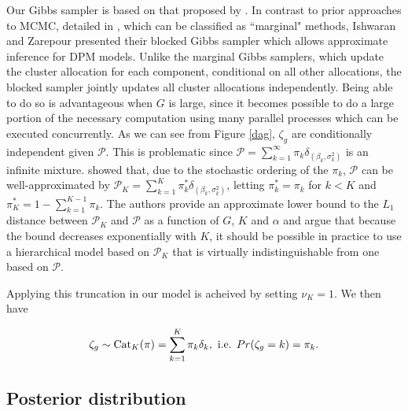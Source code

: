 {Our Gibbs sampler is based on that proposed by \citet{ishwaran2000}. In contrast to prior approaches to MCMC, detailed in \citet{neal2000}, which can be classified as ``marginal" methods, Ishwaran and Zarepour presented their blocked Gibbs sampler which allows approximate inference for DPM models. Unlike the marginal Gibbs samplers, which update the cluster allocation for each component, conditional on all other allocations, the blocked sampler jointly updates all cluster allocations independently. Being able to do so is advantageous when $G$ is large, since it becomes possible to do a large portion of the necessary computation using many parallel processes which can be executed concurrently. As we can see from Figure \ref{dag}, $\zeta_g$ are conditionally independent given $\mathcal{P}$. This is problematic since $\mathcal{P}=\sum_{k=1}^\infty \pi_k \delta_{(\beta_k,\sigma^2_k)}$ is an infinite mixture. \cite{ishwaran2001} showed that, due to the stochastic ordering of the $\pi_k$, $\mathcal{P}$ can be well-approximated by $\mathcal{P}_K=\sum_{k=1}^K \pi^*_k \delta_{(\beta_k,\sigma^2_k)}$, letting $\pi_k^*=\pi_k$ for $k<K$ and $\pi_K^* = 1-\sum_{k=1}^{K-1} \pi_k$. The authors provide an approximate lower bound to the $L_1$ distance between $\mathcal{P}_K$ and $\mathcal{P}$ as a function of $G$, $K$ and $\alpha$ and argue that because the bound decreases exponentially with $K$, it should be possible in practice to use a hierarchical model based on $\mathcal{P}_K$ that is virtually indistinguishable from one based on $\mathcal{P}$.

Applying this truncation in our model is acheived by setting $\nu_K=1$. We then have

\begin{equation*}
\zeta_g \sim \operatorname{Cat}_K(\pi) = \sum_{k=1}^K \pi_k \delta_{k}, \mbox{ i.e. } Pr(\zeta_g=k)=\pi_k.
\end{equation*}



\subsection{Posterior distribution}
\label{subsec:posterior}


}
